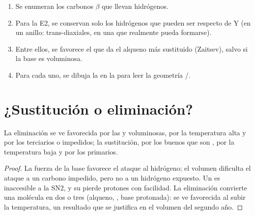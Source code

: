 \begin{method}\label{met:b1:elimination:predict-alkene}
\begin{enumerate}
  \item Se enumeran los carbonos $\beta$ que llevan hidrógenos.
  \item Para la E2, se conservan solo los hidrógenos que pueden ser
         respecto de Y (en un anillo: trans-diaxiales, en
        una  que realmente pueda formarse).
  \item Entre ellos, se favorece el que da el alqueno más sustituido
        (Zaitsev), salvo si la base es voluminosa.
  \item Para cada uno, se dibuja la  en la
         para leer la geometría /.
\end{enumerate}
\end{method}

\section{¿Sustitución o eliminación?}

\begin{proposition}\label{prop:b1:elimination:sn-vs-e}
La eliminación se ve favorecida por las  y voluminosas, por
la temperatura alta y por los  terciarios o impedidos; la
sustitución, por los buenos  que son , por la
temperatura baja y por los  primarios.
\end{proposition}

\begin{proof}
La fuerza de la base favorece el ataque al hidrógeno; el volumen
dificulta el ataque a un carbono impedido, pero no a un hidrógeno
expuesto. Un  es inaccesible a la SN2, y su 
pierde protones con facilidad. La eliminación convierte una molécula en
dos o tres (alqueno, , base protonada): se ve favorecida al
subir la temperatura, un resultado que se justifica en el volumen del
segundo año.
\end{proof}

